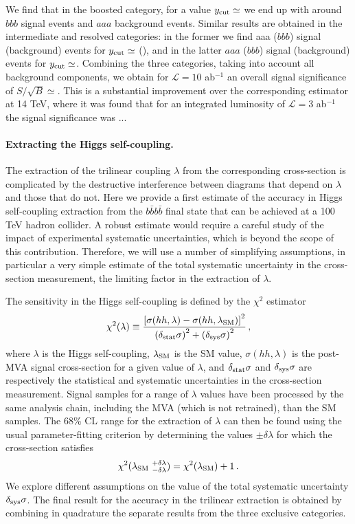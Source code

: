 \documentclass[a4paper,10pt]{article}
\newcommand{\be}{\begin{equation}}
\newcommand{\ee}{\end{equation}}
\newcommand{\lc}{\left[}
\newcommand{\rc}{\right]}
\newcommand{\lp}{\left(}
\newcommand{\rp}{\right)}
\begin{document}
%
We find that
in the boosted category, for a value $y_{\rm cut}\simeq $
we end up with around $bbb$ signal events and $aaa$ background
events.
%
Similar results are obtained in the intermediate and resolved
categories: in the former we find aaa ($bbb$) signal (background)
events for $y_{\rm cut}\simeq $ (), and in the latter
$aaa$ ($bbb$) signal (background) events for
$y_{\rm cut}\simeq$.
%
Combining the three categories, taking into
account all background components, we obtain for
$\mathcal{L}=10$ ab$^{-1}$ an overall signal
significance of $S/\sqrt{B}\simeq$.
%
This is a substantial improvement over the corresponding
estimator at 14 TeV, where it was found that for an integrated
luminosity of $\mathcal{L}=3$ ab$^{-1}$ the signal significance was ...

\paragraph{Extracting the Higgs self-coupling.}
%
The extraction of the trilinear coupling $\lambda$ from the
  corresponding cross-section is complicated by the
  destructive interference
  between diagrams that depend on $\lambda$ and those that do not.
 Here we provide a first estimate of the accuracy
  in Higgs self-coupling extraction from the $b\bar{b}b\bar{b}$ final state
  that can be achieved at a 100 TeV hadron collider.
  A robust estimate  would require
  a careful study of the impact of
  experimental systematic uncertainties, which is beyond the scope of this contribution.
  Therefore, we will use a number of simplifying assumptions, in particular
  a very simple estimate of the total systematic uncertainty in the cross-section
  measurement, the limiting factor in the extraction of $\lambda$.

  The sensitivity in the Higgs self-coupling is defined by the $\chi^2$ estimator
  \be
  \label{eq:chi2profile}
  \chi^2(\lambda) \equiv \frac{\lc \sigma(hh,\lambda) - \sigma(hh,\lambda_{\rm SM})
    \rc^2}{\lp \delta_{\rm stat}\sigma\rp^2+\lp \delta_{\rm sys}\sigma\rp^2 } \, ,
  \ee
  where $\lambda$ is the Higgs
  self-coupling, $\lambda_{\rm SM}$ is the SM value, $\sigma(hh,\lambda)$ is the
  post-MVA signal cross-section for a given value of $\lambda$, and $\delta_{\rm stat}\sigma$ and
  $\delta_{\rm sys}\sigma$ are respectively the statistical and systematic uncertainties in the cross-section
  measurement.
  Signal samples for a range of $\lambda$ values have been  processed
  by the same analysis chain, including the MVA (which is not
  retrained), than the SM samples.
  The 68\% CL range for the extraction of $\lambda$ can then be found using
  the usual parameter-fitting criterion by determining the values $\pm \delta\lambda$
  for which the cross-section satisfies
  \be
  \label{eq:condition}
\chi^2(\lambda_{\rm SM}~^{+\delta\lambda}_{-\delta\lambda})=\chi^2(\lambda_{\rm SM})+1 \, .
\ee
%
We explore different assumptions on the value of the total systematic uncertainty $\delta_{\rm sys}\sigma$.
%
The final result for the accuracy in the trilinear extraction is obtained by combining
in quadrature the separate results
from the three exclusive categories.
\end{document}
